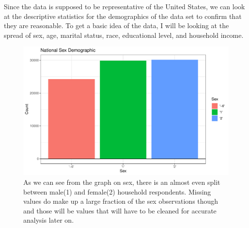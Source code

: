 \documentclass{article}
\begin{document}
Since the data is supposed to be representative of the United States, we can look at the descriptive statistics for the demographics of the data set to confirm that they are reasonable. To get a basic idea of the data, I will be looking at the spread of sex, age, marital status, race, educational level, and household income.
\newline
{}

\begin{figure}[H]
\centering
\includegraphics{Thesis_Proposal-002}
\caption{As we can see from the graph on sex, there is an almost even split between male(1) and female(2) household respondents. Missing values do make up a large fraction of the sex observations though and those will be values that will have to be cleaned for accurate analysis later on.}
\label{Figure 1}
\end{figure}
\end{document}
